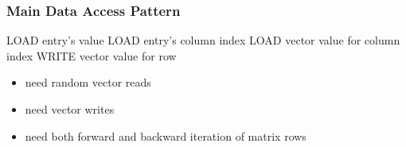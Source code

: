 \documentclass{beamer}
\begin{document}

\begin{frame}
	\frametitle{Main Data Access Pattern}
	\begin{algorithmic}
				\STATE LOAD entry's value
				\STATE LOAD entry's column index
				\STATE LOAD vector value for column index
			\ENDFOR
			\STATE WRITE vector value for row
		\ENDFOR
	\end{algorithmic}
	
	\begin{itemize}
		\item need random vector reads
		\item need vector writes
		\item need both forward and backward iteration of matrix rows
	\end{itemize}
\end{frame}


%	
%	
\end{document}
